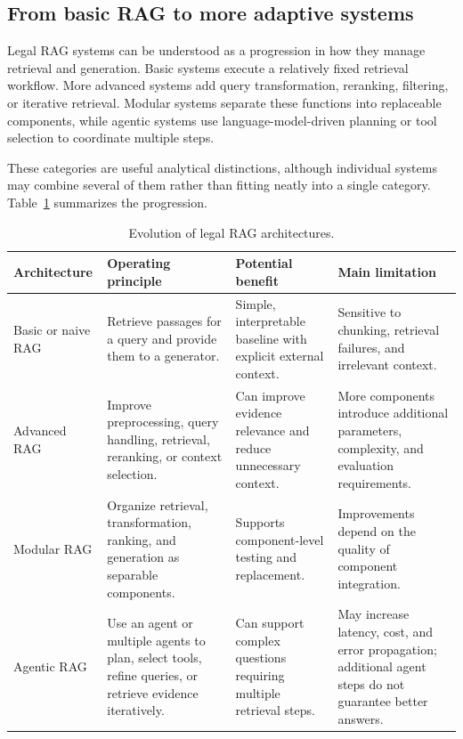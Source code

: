 \subsection{From basic RAG to more adaptive systems}

Legal RAG systems can be understood as a progression in how they manage retrieval and generation.
Basic systems execute a relatively fixed retrieval workflow. More advanced systems add query
transformation, reranking, filtering, or iterative retrieval. Modular systems separate these
functions into replaceable components, while agentic systems use language-model-driven planning or
tool selection to coordinate multiple steps.

These categories are useful analytical distinctions, although individual systems may combine several
of them rather than fitting neatly into a single category. Table~\ref{tab:ragevol} summarizes the
progression.

\begin{table}[tp]
\centering
\caption{Evolution of legal RAG architectures.}
\label{tab:ragevol}
\footnotesize
\setlength{\tabcolsep}{5pt}
\renewcommand{\arraystretch}{1.3}
\begin{tabularx}{\textwidth}{>{\raggedright\arraybackslash}p{2.6cm} >{\raggedright\arraybackslash}X >{\raggedright\arraybackslash}X >{\raggedright\arraybackslash}X}
\toprule
\textbf{Architecture} & \textbf{Operating principle} & \textbf{Potential benefit} & \textbf{Main limitation} \\
\midrule
Basic or naive RAG & Retrieve passages for a query and provide them to a generator. & Simple, interpretable baseline with explicit external context. & Sensitive to chunking, retrieval failures, and irrelevant context. \\
Advanced RAG & Improve preprocessing, query handling, retrieval, reranking, or context selection. & Can improve evidence relevance and reduce unnecessary context. & More components introduce additional parameters, complexity, and evaluation requirements. \\
Modular RAG & Organize retrieval, transformation, ranking, and generation as separable components. & Supports component-level testing and replacement. & Improvements depend on the quality of component integration. \\
Agentic RAG & Use an agent or multiple agents to plan, select tools, refine queries, or retrieve evidence iteratively. & Can support complex questions requiring multiple retrieval steps. & May increase latency, cost, and error propagation; additional agent steps do not guarantee better answers. \\
\bottomrule
\end{tabularx}
\end{table}

